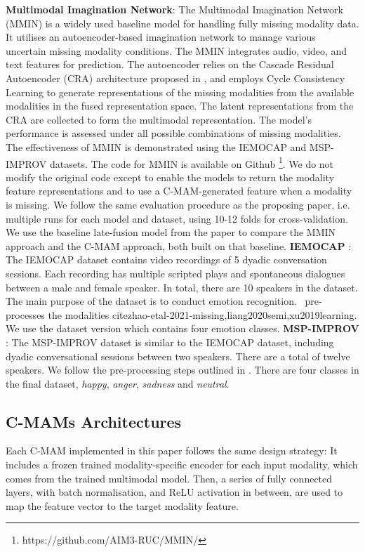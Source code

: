 \textbf{Multimodal Imagination Network}: The Multimodal Imagination Network (MMIN) is a widely used baseline model for handling fully missing modality data. It utilises an autoencoder-based imagination network to manage various uncertain missing modality conditions. The MMIN integrates audio, video, and text features for prediction. The autoencoder relies on the Cascade Residual Autoencoder (CRA) architecture proposed in \cite{Tran_2017_CVPR}, and employs Cycle Consistency Learning \cite{zhu2017unpaired} to generate representations of the missing modalities from the available modalities in the fused representation space. The latent representations from the CRA are collected to form the multimodal representation. The model's performance is assessed under all possible combinations of missing modalities. The effectiveness of MMIN is demonstrated using the IEMOCAP and MSP-IMPROV datasets. The code for MMIN is available on Github \footnote{https://github.com/AIM3-RUC/MMIN/}. We do not modify the original code except to enable the models to return the modality feature representations and to use a C-MAM-generated feature when a modality is missing. We follow the same evaluation procedure as the proposing paper, i.e. multiple runs for each model and dataset, using 10-12 folds for cross-validation. We use the baseline late-fusion model from the paper to compare the MMIN approach and the C-MAM approach, both built on that baseline. \textbf{IEMOCAP} \cite{busso2008iemocap}: The IEMOCAP dataset contains video recordings of 5 dyadic conversation sessions. Each recording has multiple scripted plays and spontaneous dialogues between a male and female speaker. In total, there are 10 speakers in the dataset. The main purpose of the dataset is to conduct emotion recognition. \ pre-processes the modalities cite{zhao-etal-2021-missing,liang2020semi,xu2019learning}. We use the dataset version which contains four emotion classes. \textbf{MSP-IMPROV} \cite{Busso_2017}: The MSP-IMPROV dataset is similar to the IEMOCAP dataset, including dyadic conversational sessions between two speakers. There are a total of twelve speakers. We follow the pre-processing steps outlined in \cite{zhao-etal-2021-missing}. There are four classes in the final dataset, \textit{happy}, \textit{anger}, \textit{sadness} and \textit{neutral}.

\subsection{C-MAMs Architectures}
Each C-MAM implemented in this paper follows the same design strategy: It includes a frozen trained modality-specific encoder for each input modality, which comes from the trained multimodal model. Then, a series of fully connected layers, with batch normalisation, and ReLU activation in between, are used to map the feature vector to the target modality feature. 

